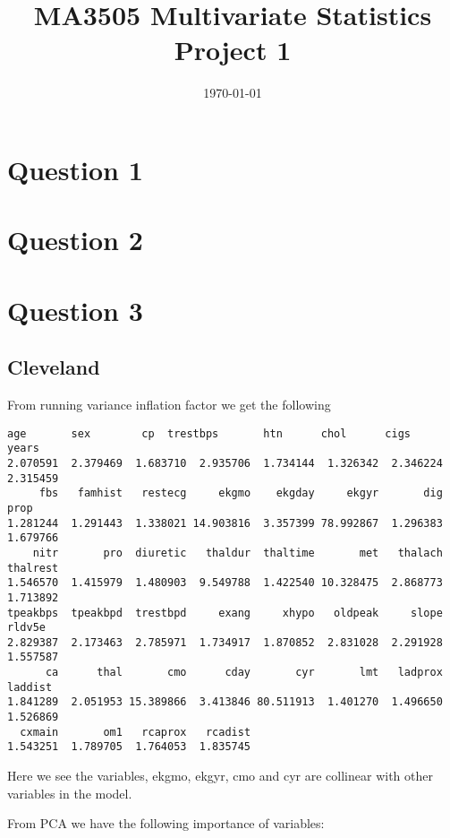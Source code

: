 \documentclass[a4paper]{article}
\title{MA3505 Multivariate Statistics Project 1}
\date{\today}
\begin{document}
\maketitle


\section{Question 1}


\section{Question 2}


\section{Question 3}

\subsection{Cleveland}

From running variance inflation factor we get the following

\begin{lstlisting}[frame=single]
     age       sex        cp  trestbps       htn      chol      cigs     years 
2.070591  2.379469  1.683710  2.935706  1.734144  1.326342  2.346224  2.315459 
     fbs   famhist   restecg     ekgmo    ekgday     ekgyr       dig      prop 
1.281244  1.291443  1.338021 14.903816  3.357399 78.992867  1.296383  1.679766 
    nitr       pro  diuretic   thaldur  thaltime       met   thalach  thalrest 
1.546570  1.415979  1.480903  9.549788  1.422540 10.328475  2.868773  1.713892 
tpeakbps  tpeakbpd  trestbpd     exang     xhypo   oldpeak     slope    rldv5e 
2.829387  2.173463  2.785971  1.734917  1.870852  2.831028  2.291928  1.557587 
      ca      thal       cmo      cday       cyr       lmt   ladprox   laddist 
1.841289  2.051953 15.389866  3.413846 80.511913  1.401270  1.496650  1.526869 
  cxmain       om1   rcaprox   rcadist 
1.543251  1.789705  1.764053  1.835745 
\end{lstlisting}

Here we see the variables, ekgmo, ekgyr, cmo and cyr are collinear with other variables in the model. 

From PCA we have the following importance of variables:
\end{document}
